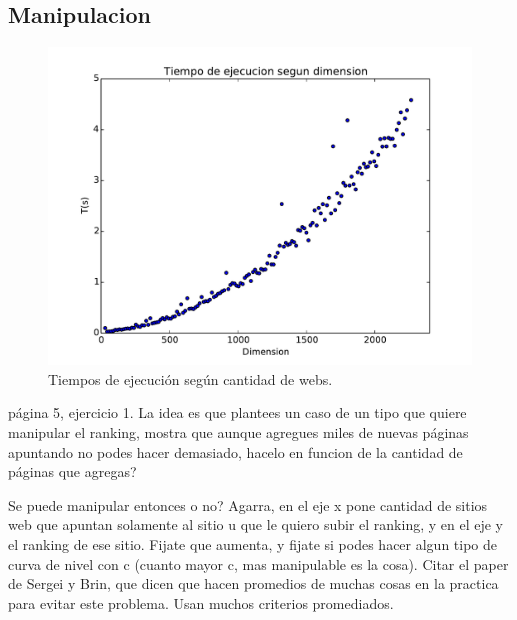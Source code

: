 \subsection{Manipulacion}

\begin{figure}[H]
\centering
\includegraphics[scale=0.7]{images/complejidad.pdf}
\caption{Tiempos de ejecución según cantidad de webs.}
\label{timePageRank}
\end{figure}




página 5, ejercicio 1. La idea es que plantees un caso de un tipo que quiere manipular el ranking, mostra que aunque agregues miles de nuevas páginas apuntando no podes hacer demasiado, hacelo en funcion de la cantidad de páginas que agregas?

Se puede manipular entonces o no? Agarra, en el eje x pone cantidad de sitios web que apuntan solamente al sitio u que le quiero subir el ranking, y en el eje y el ranking de ese sitio. Fijate que aumenta, y fijate si podes hacer algun tipo de curva de nivel con c (cuanto mayor c, mas manipulable es la cosa). Citar el paper de Sergei y Brin, que dicen que hacen promedios de muchas cosas en la practica para evitar este problema. Usan muchos criterios promediados.